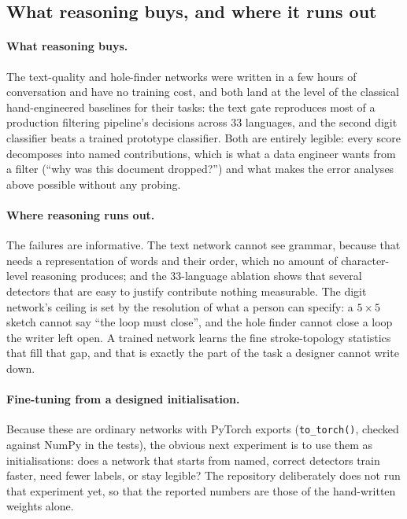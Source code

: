 \subsection{What reasoning buys, and where it runs out}
\paragraph{What reasoning buys.} The text-quality and hole-finder networks were written in a few hours of
conversation and have no training cost, and both land at the level of the classical
hand-engineered baselines for their tasks: the text gate reproduces most of a production
filtering pipeline's decisions across 33 languages, and the second digit classifier beats a trained prototype classifier. Both are entirely legible: every score decomposes into named
contributions, which is what a data engineer wants from a filter (``why was this document
dropped?'') and what makes the error analyses above possible without any probing.

\paragraph{Where reasoning runs out.} The failures are informative. The text network
cannot see grammar, because that needs a representation of words and their order, which
no amount of character-level reasoning produces; and the 33-language ablation shows that
several detectors that are easy to justify contribute nothing measurable. The digit
network's ceiling is set by the resolution of what a person can specify: a $5\times5$
sketch cannot say ``the loop must close'', and the hole finder cannot close a loop the
writer left open. A trained network learns the fine stroke-topology statistics that fill
that gap, and that is exactly the part of the task a designer cannot write down.

\paragraph{Fine-tuning from a designed initialisation.} Because these are ordinary networks
with PyTorch exports (\texttt{to\_torch()}, checked against NumPy in the tests), the
obvious next experiment is to use them as initialisations: does a network that starts
from named, correct detectors train faster, need fewer labels, or stay legible? The
repository deliberately does not run that experiment yet, so that the reported numbers
are those of the hand-written weights alone.

